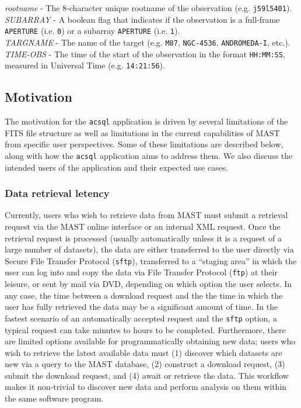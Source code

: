 \documentclass[10pt,journal,compsoc]{IEEEtran}
\begin{document}
\textit{rootname} - The 8-character unique rootname of the observation (e.g. \texttt{j59l5401}).\\

\textit{SUBARRAY} - A boolean flag that indicates if the observation is a full-frame \texttt{APERTURE} (i.e. \texttt{0}) or a subarray \texttt{APERTURE} (i.e. \texttt{1}).\\

\textit{TARGNAME} - The name of the target (e.g. \texttt{M87}, \texttt{NGC-4536}, \texttt{ANDROMEDA-I}, etc.).\\

\textit{TIME-OBS} - The time of the start of the observation in the format \texttt{HH:MM:SS}, measured in Universal Time (e.g. \texttt{14:21:56}).\\


\subsection{Motivation} \label{sec1.3}

The motivation for the \texttt{acsql} application is driven by several limitations of the FITS file structure as well as limitations in the current capabilities of
MAST from specific user perspectives. Some of these limitations are described below, along with how the \texttt{acsql} application aims to address them.  We also
discuss the intended users of the application and their expected use cases.


\subsubsection{Data retrieval letency} \label{sec1.3.1}

Currently, users who wish to retrieve data from MAST must submit a retrieval request via the MAST online interface or an internal XML request. Once the retrieval
request is processed (usually automatically unless it is a request of a large number of datasets), the data are either transferred to the user directly via
Secure File Transfer Protocol (\texttt{sftp}), transferred to a ``staging area'' in which the user can log into and copy the data via File Transfer Protocol (\texttt{ftp})
at their leisure, or sent by mail via DVD, depending on which option the user selects.  In any case, the time between a download request and the the time in which the
user has fully retrieved the data may be a significant amount of time.  In the fastest scenario of an automatically accepted request and the \texttt{sftp} option, a
typical request can take minutes to hours to be completed. Furthermore, there are limited options available for programmatically obtaining new data; users who wish to
retrieve the latest available data must (1) discover which datasets are new via a query to the MAST database, (2) construct a download request, (3) submit the download
request, and (4) await or retrieve the data.  This workflow makes it non-trivial to discover new data and perform analysis on them within the same software program.
\end{document}
